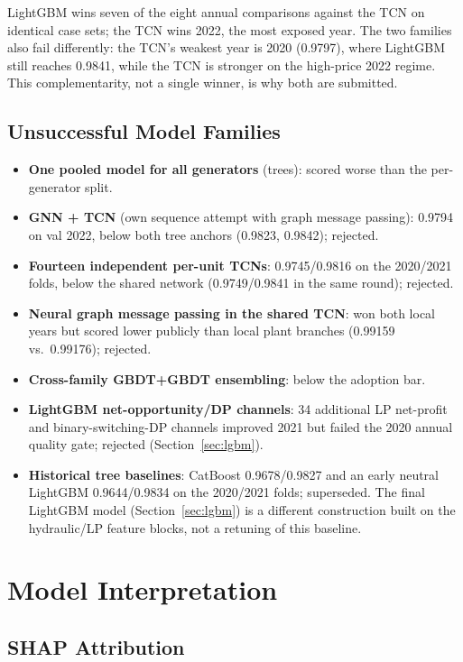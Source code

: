 \documentclass{article}
\begin{document}
LightGBM wins seven of the eight annual comparisons against the TCN on
identical case sets; the TCN wins 2022, the most exposed year. The two
families also fail differently: the TCN's weakest year is 2020 (0.9797),
where LightGBM still reaches 0.9841, while the TCN is stronger on the
high-price 2022 regime. This complementarity, not a single winner, is
why both are submitted.

\subsection{Unsuccessful Model Families}

\begin{itemize}
    \item \textbf{One pooled model for all generators} (trees): scored
    worse than the per-generator split.
    \item \textbf{GNN + TCN} (own sequence attempt with graph message
    passing): 0.9794 on val 2022, below both tree anchors (0.9823,
    0.9842); rejected.
    \item \textbf{Fourteen independent per-unit TCNs}: 0.9745/0.9816 on
    the 2020/2021 folds, below the shared network (0.9749/0.9841 in the
    same round); rejected.
    \item \textbf{Neural graph message passing in the shared TCN}: won
    both local years but scored lower publicly than local plant branches
    (0.99159 vs.\ 0.99176); rejected.
    \item \textbf{Cross-family GBDT+GBDT ensembling}: below the adoption
    bar.
    \item \textbf{LightGBM net-opportunity/DP channels}: 34 additional
    LP net-profit and binary-switching-DP channels improved 2021 but
    failed the 2020 annual quality gate; rejected
    (Section~\ref{sec:lgbm}).
    \item \textbf{Historical tree baselines}: CatBoost 0.9678/0.9827 and
    an early neutral LightGBM 0.9644/0.9834 on the 2020/2021 folds;
    superseded. The final LightGBM model (Section~\ref{sec:lgbm}) is a
    different construction built on the hydraulic/LP feature blocks,
    not a retuning of this baseline.
\end{itemize}

\section{Model Interpretation}
\label{sec:interpretation}

\subsection{SHAP Attribution}
\label{sec:shap}
\end{document}
